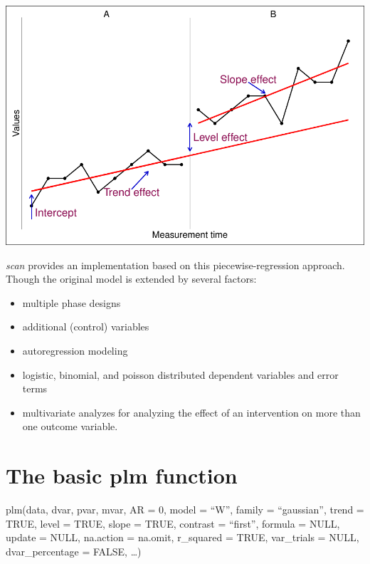 \documentclass[
  letterpaper,
  DIV=11,
  numbers=noendperiod]{scrreprt}
\providecommand{\tightlist}{%
  \setlength{\itemsep}{0pt}\setlength{\parskip}{0pt}}\usepackage{longtable,booktabs,array}
\begin{document}
\includegraphics{./ch_piecewise_regression_files/figure-pdf/figure_plm-1.pdf}

\emph{scan} provides an implementation based on this
piecewise-regression approach. Though the original model is extended by
several factors:

\begin{itemize}
\tightlist
\item
  multiple phase designs
\item
  additional (control) variables
\item
  autoregression modeling
\item
  logistic, binomial, and poisson distributed dependent variables and
  error terms
\item
  multivariate analyzes for analyzing the effect of an intervention on
  more than one outcome variable.
\end{itemize}

\hypertarget{the-basic-plm-function}{%
\section{The basic plm function}\label{the-basic-plm-function}}

\begin{tcolorbox}[enhanced jigsaw, toprule=.15mm, colframe=quarto-callout-tip-color-frame, left=2mm, colback=white, breakable, bottomrule=.15mm, arc=.35mm, rightrule=.15mm, leftrule=.75mm, opacityback=0]
\begin{minipage}[t]{5.5mm}
\textcolor{quarto-callout-tip-color}{\faLightbulb}
\end{minipage}%
\begin{minipage}[t]{\textwidth - 5.5mm}
plm(data, dvar, pvar, mvar, AR = 0, model = ``W'', family =
``gaussian'', trend = TRUE, level = TRUE, slope = TRUE, contrast =
``first'', formula = NULL, update = NULL, na.action = na.omit,
r\_squared = TRUE, var\_trials = NULL, dvar\_percentage = FALSE,
\ldots)\end{minipage}%
\end{tcolorbox}
\end{document}
